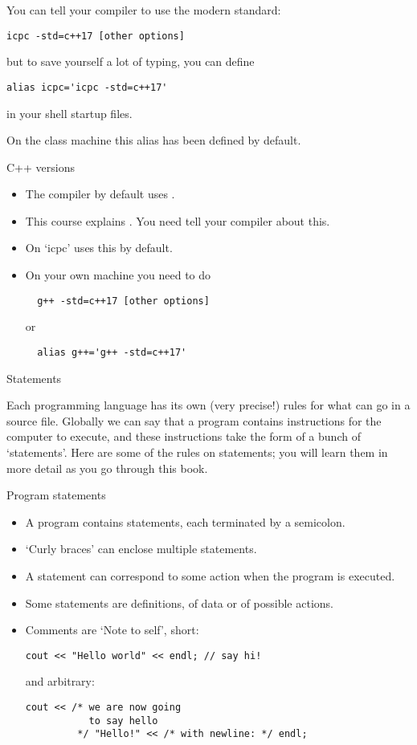 You can tell your compiler to use the modern standard:
\begin{verbatim}
icpc -std=c++17 [other options]
\end{verbatim}
but to save yourself a lot of typing, you can define
\begin{verbatim}
alias icpc='icpc -std=c++17'
\end{verbatim}
in your shell startup files.
\begin{tacc}
On the class  machine this alias has been defined by default.
\end{tacc}

\begin{slide}{C++ versions}
  \label{sl:cpp-version}
  \begin{itemize}
  \item
    The compiler by default uses . 
  \item This course explains . You need tell your compiler
    about this.
  \item On  `icpc' uses this by default.
  \item On your own machine you need to do
\begin{verbatim}
  g++ -std=c++17 [other options]
\end{verbatim}
or
\begin{verbatim}
  alias g++='g++ -std=c++17'
\end{verbatim}
  \end{itemize}
\end{slide}

 {Statements}
\label{sec:statements}

Each programming language has its own (very precise!) rules for what
can go in a source file. Globally we can say that a program contains
instructions for the computer to execute, and these instructions take
the form of a bunch of `statements'. Here are some of the rules on
statements; you will learn them in more detail as you go through this
book.

\begin{block}{Program statements}
  \label{sl:cstatement}
  \begin{itemize}
  \item
    A program contains statements, each terminated by a semicolon.
  \item `Curly braces' can enclose multiple statements.
  \item A statement can correspond to some action when the program is
    executed.
  \item Some statements are definitions, of data or of possible actions.
  \item Comments are `Note to self', short:
\begin{lstlisting}
cout << "Hello world" << endl; // say hi!
\end{lstlisting}
and arbitrary:
\begin{lstlisting}
cout << /* we are now going
           to say hello
         */ "Hello!" << /* with newline: */ endl;
\end{lstlisting}
  \end{itemize}
\end{block}

